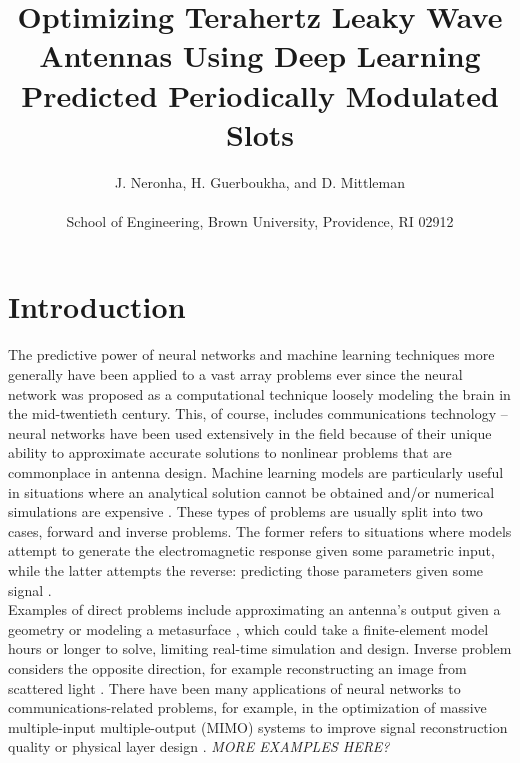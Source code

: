 \documentclass[11pt]{article}
\begin{document}
\title{Optimizing Terahertz Leaky Wave Antennas Using Deep Learning Predicted Periodically  Modulated Slots}
\author{J. Neronha, H. Guerboukha, and D. Mittleman \\ \\ \small School of Engineering, Brown University, Providence, RI 02912}
\date{}

\maketitle

\section*{Introduction}

The predictive power of neural networks and machine learning techniques more generally have been applied to a vast array problems ever since the neural network was proposed as a computational technique loosely modeling the brain in the mid-twentieth century. \cite{McCulloch:1943vq} This, of course, includes communications technology -- neural networks have been used extensively in the field because of their unique ability to approximate accurate solutions to nonlinear problems that are commonplace in antenna design. Machine learning models are particularly useful in situations where an analytical solution cannot be obtained and/or numerical simulations are expensive \cite{Kim, Massa}. These types of problems are usually split into two cases, forward and inverse problems. The former refers to situations where models attempt to generate the electromagnetic response given some parametric input, while the latter attempts the reverse: predicting those parameters given some signal \cite{9395365}. \\

\noindent Examples of direct problems include approximating an antenna's output given a geometry \cite{8608745} or modeling a metasurface \cite{Nadell:19}, which could take a finite-element model hours or longer to solve, limiting real-time simulation and design. Inverse problem considers the opposite direction, for example reconstructing an image from scattered light \cite{Sun:18}. There have been many applications of neural networks to communications-related problems, for example, in the optimization of massive multiple-input multiple-output (MIMO) systems to improve signal reconstruction quality \cite{8322184} or physical layer design \cite{DBLP:journals/corr/OSheaEC17}. \emph{MORE EXAMPLES HERE?} \\
\end{document}
